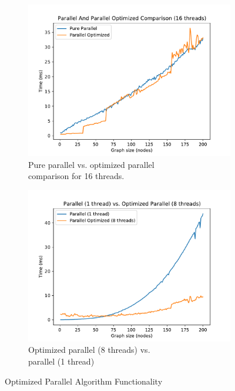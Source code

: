 \documentclass[11pt,a4paper]{article}
\begin{document}
\begin{figure}[t]
   \centering
   \begin{subfigure}{.45\textwidth}
      \centering
      \includegraphics[width=\linewidth]{par_paropt16.pdf}
      \caption{Pure parallel vs. optimized parallel \\comparison for 16 threads.}
      \label{fig:paropt_comparison}
   \end{subfigure}%
   \begin{subfigure}{.45\textwidth}
      \centering
      \includegraphics[width=\linewidth]{par1_optPar8.pdf}
      \caption{Optimized parallel (8 threads) vs. \\parallel (1 thread)}
      \label{fig:par_paropt8}
   \end{subfigure}
   \caption{Optimized Parallel Algorithm Functionality}
   \label{fig:paropt}
\end{figure}
\end{document}
